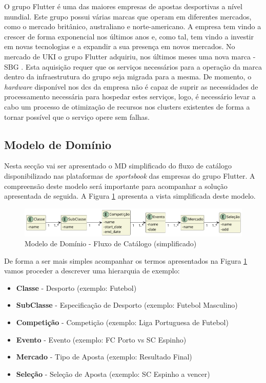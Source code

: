 O grupo Flutter é uma das maiores empresas de apostas desportivas a nível mundial. Este grupo
possui várias marcas que operam em diferentes mercados, como o mercado britânico, australiano e
norte-americano. A empresa tem vindo a crescer de forma exponencial nos últimos anos e, como tal,
tem vindo a investir em novas tecnologias e a expandir a sua presença em novos mercados. No mercado
de \ac{UKI} o grupo Flutter adquiriu, nos últimos meses uma nova marca - \ac{SBG} \cite{skybet}. 
Esta aquisição requer que os serviços necessários para a operação da marca dentro da infraestrutura 
do grupo seja migrada para a mesma. De momento, o \textit{hardware} disponível nos \glspl{dc} da 
empresa não é capaz de suprir as necessidades de processamento necessária para hospedar estes 
serviços, logo, é necessário levar a cabo um processo de otimização de recursos nos \glspl{cluster} 
existentes de forma a tornar possível que o serviço opere sem falhas.

\subsection{Modelo de Domínio}

Nesta secção vai ser apresentado o \ac{MD} simplificado do fluxo de catálogo disponibilizado nas 
plataformas de \textit{sportsbook} das empresas do grupo Flutter. A compreensão deste modelo será
importante para acompanhar a solução apresentada de seguida. A Figura \ref{md} apresenta a vista
simplificada deste modelo.

\begin{figure}[H]
  \centerline{\includegraphics[scale=0.4]{media/content/analise/dm.png}}
  \caption{Modelo de Domínio - Fluxo de Catálogo (simplificado)}
  \label{md}
\end{figure}

De forma a ser mais simples acompanhar os termos apresentados na Figura \ref{md} vamos proceder 
a descrever uma hierarquia de exemplo:

\begin{itemize}
  \item \textbf{Classe} - Desporto (exemplo: Futebol)
  \item \textbf{SubClasse} - Especificação de Desporto (exemplo: Futebol Masculino)
  \item \textbf{Competição} - Competição (exemplo: Liga Portuguesa de Futebol)
  \item \textbf{Evento} - Evento (exemplo: FC Porto vs SC Espinho)
  \item \textbf{Mercado} - Tipo de Aposta (exemplo: Resultado Final)
  \item \textbf{Seleção} - Seleção de Aposta (exemplo: SC Espinho a vencer)
\end{itemize}

